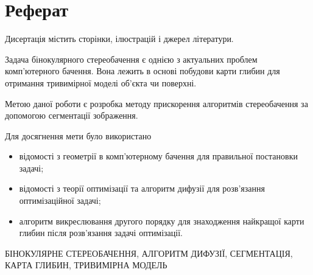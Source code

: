 \chapter*{Реферат}

Дисертація містить \pageref{LastPage} сторінки,
 ілюстрацій і
 джерел літератури.

Задача бінокулярного стереобачення є
однією з актуальних проблем комп'ютерного бачення.
Вона лежить в основі побудови карти глибин
для отримання тривимірної моделі об'єкта чи поверхні.

Метою даної роботи є розробка методу прискорення алгоритмів стереобачення
за допомогою сегментації зображення.

Для досягнення мети було використано
\begin{itemize}
  \item відомості з геометрії в комп'ютерному бачення
        для правильної постановки задачі;
  \item відомості з теорії оптимізації та
        алгоритм дифузії для розв'язання оптимізаційної задачі;
  \item алгоритм викреслювання другого порядку для знаходження
        найкращої карти глибин після розв'язання задачі оптимізації.
\end{itemize}

\MakeUppercase{бінокулярне стереобачення,
               алгоритм дифузії,
               сегментація,
               карта глибин,
               тривимірна модель}

